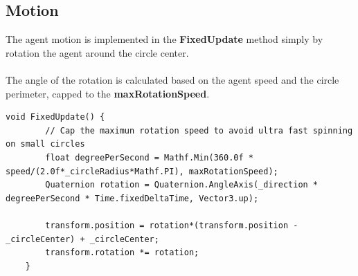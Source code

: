 \documentclass[12pt, a4paper]{article}
\begin{document}
\subsection{Motion}
The agent motion is implemented in the \textbf{FixedUpdate} method simply by rotation the agent around the circle center.\\\\
The angle of the rotation is calculated based on the agent speed and the circle perimeter, capped to the \textbf{maxRotationSpeed}.
\begin{lstlisting}[caption={FixedUpdate}]
   void FixedUpdate() {
        // Cap the maximun rotation speed to avoid ultra fast spinning on small circles
        float degreePerSecond = Mathf.Min(360.0f * speed/(2.0f*_circleRadius*Mathf.PI), maxRotationSpeed);
        Quaternion rotation = Quaternion.AngleAxis(_direction * degreePerSecond * Time.fixedDeltaTime, Vector3.up);

        transform.position = rotation*(transform.position - _circleCenter) + _circleCenter;
        transform.rotation *= rotation;
    }
\end{lstlisting}
\end{document}

